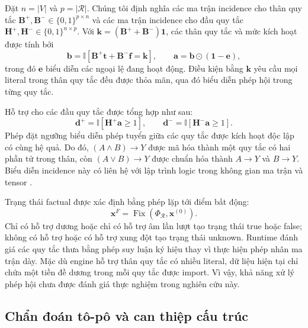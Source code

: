 Đặt $n=|V|$ và $p=|\mathcal{R}|$. Chúng tôi định nghĩa các ma trận incidence
cho thân quy tắc
$\mathbf{B}^{+},\mathbf{B}^{-}\in\{0,1\}^{p\times n}$ và các ma trận incidence
cho đầu quy tắc
$\mathbf{H}^{+},\mathbf{H}^{-}\in\{0,1\}^{n\times p}$. Với
$\mathbf{k}=(\mathbf{B}^{+}+\mathbf{B}^{-})\mathbf{1}$, các thân quy tắc và mức
kích hoạt được tính bởi
\begin{equation}
\mathbf{b}
=
\mathbb{I}
[\mathbf{B}^{+}\mathbf{t}
+\mathbf{B}^{-}\mathbf{f}
=\mathbf{k}],
\qquad
\mathbf{a}
=
\mathbf{b}\odot(\mathbf{1}-\mathbf{e}),
\label{eq:rule_activation}
\end{equation}
trong đó $\mathbf{e}$ biểu diễn các ngoại lệ đang hoạt động. Điều kiện bằng
$\mathbf{k}$ yêu cầu mọi literal trong thân quy tắc đều được thỏa mãn, qua đó
biểu diễn phép hội trong từng quy tắc.

Hỗ trợ cho các đầu quy tắc được tổng hợp như sau:
\begin{equation}
\mathbf{d}^{+}
=
\mathbb{I}[\mathbf{H}^{+}\mathbf{a}\geq1],
\qquad
\mathbf{d}^{-}
=
\mathbb{I}[\mathbf{H}^{-}\mathbf{a}\geq1].
\label{eq:head_support}
\end{equation}
Phép đặt ngưỡng biểu diễn phép tuyển giữa các quy tắc được kích hoạt độc lập có
cùng hệ quả. Do đó, $(A\land B)\rightarrow Y$ được mã hóa thành một quy tắc có
hai phần tử trong thân, còn $(A\lor B)\rightarrow Y$ được chuẩn hóa thành
$A\rightarrow Y$ và $B\rightarrow Y$. Biểu diễn incidence này có liên hệ với
lập trình logic trong không gian ma trận và tensor
\cite{sakama2021tensor}.

Trạng thái factual được xác định bằng phép lặp tới điểm bất động:
\begin{equation}
\mathbf{x}^{F}
=
\operatorname{Fix}
(\Phi_{\mathcal{R}},\mathbf{x}^{(0)}).
\label{eq:factual_fixed_point}
\end{equation}
Chỉ có hỗ trợ dương hoặc chỉ có hỗ trợ âm lần lượt tạo trạng thái true hoặc
false; không có hỗ trợ hoặc có hỗ trợ xung đột tạo trạng thái unknown. Runtime
đánh giá các quy tắc thưa bằng phép suy luận ký hiệu thay vì thực hiện phép nhân
ma trận dày. Mặc dù engine hỗ trợ thân quy tắc có nhiều literal, dữ liệu hiện
tại chỉ chứa một tiền đề dương trong mỗi quy tắc được import. Vì vậy, khả năng
xử lý phép hội chưa được đánh giá thực nghiệm trong nghiên cứu này.

\subsection{Chẩn đoán tô-pô và can thiệp cấu trúc}

